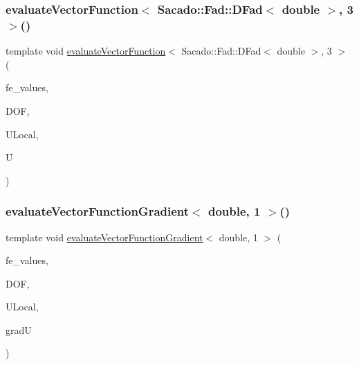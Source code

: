 \mbox{\label{function_evaluations_8cc_a49bf826d13c295bef33c6d320e96a6ee}} 
\subsubsection{\texorpdfstring{evaluate\+Vector\+Function$<$ Sacado\+::\+Fad\+::\+D\+Fad$<$ double $>$, 3 $>$()}{evaluateVectorFunction< Sacado::Fad::DFad< double >, 3 >()}}
{\footnotesize\ttfamily template void \mbox{\hyperlink{group___evaluation_functions_gab9e164be1be244df81c932426a4bd513}{evaluate\+Vector\+Function}}$<$ Sacado\+::\+Fad\+::\+D\+Fad$<$ double $>$, 3 $>$ (\begin{DoxyParamCaption}\item[{const F\+E\+Values$<$ 3 $>$ \&}]{fe\+\_\+values,  }\item[{unsigned int}]{D\+OF,  }\item[{Table$<$ 1, Sacado\+::\+Fad\+::\+D\+Fad$<$ double $>$$>$ \&}]{U\+Local,  }\item[{Table$<$ 2, Sacado\+::\+Fad\+::\+D\+Fad$<$ double $>$$>$ \&}]{U }\end{DoxyParamCaption})}

\mbox{\label{function_evaluations_8cc_a960ffa13fae84ece6dc59bc0b91beea3}} 
\subsubsection{\texorpdfstring{evaluate\+Vector\+Function\+Gradient$<$ double, 1 $>$()}{evaluateVectorFunctionGradient< double, 1 >()}\hspace{0.1cm}{\footnotesize\ttfamily [1/4]}}
{\footnotesize\ttfamily template void \mbox{\hyperlink{group___evaluation_functions_ga9608539d601a91aff1ba01ccc720fbe0}{evaluate\+Vector\+Function\+Gradient}}$<$ double, 1 $>$ (\begin{DoxyParamCaption}\item[{const F\+E\+Values$<$ 1 $>$ \&}]{fe\+\_\+values,  }\item[{unsigned int}]{D\+OF,  }\item[{Table$<$ 1, double $>$ \&}]{U\+Local,  }\item[{Table$<$ 3, double $>$ \&}]{gradU }\end{DoxyParamCaption})}

